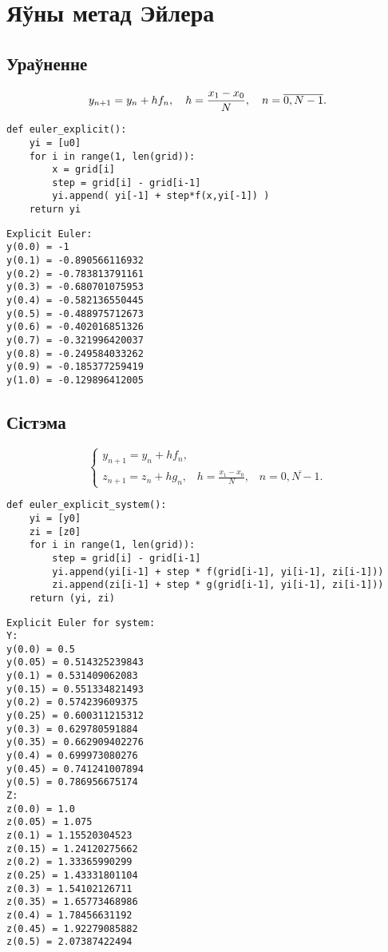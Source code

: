 \section{Яўны метад Эйлера}
\subsection*{Ураўненне}
\begin{equation}
    y_{n+1} = y_n + hf_n, \hspace{10pt} h = \frac{x_1-x_0}{N}, \hspace{10pt} n = \overline{0, N-1}. \\
\end{equation}

{\small
\begin{verbatim}
def euler_explicit():
    yi = [u0]
    for i in range(1, len(grid)):
        x = grid[i]
        step = grid[i] - grid[i-1]
        yi.append( yi[-1] + step*f(x,yi[-1]) )
    return yi
\end{verbatim}
}

{\small
\begin{verbatim}
Explicit Euler:
y(0.0) = -1
y(0.1) = -0.890566116932
y(0.2) = -0.783813791161
y(0.3) = -0.680701075953
y(0.4) = -0.582136550445
y(0.5) = -0.488975712673
y(0.6) = -0.402016851326
y(0.7) = -0.321996420037
y(0.8) = -0.249584033262
y(0.9) = -0.185377259419
y(1.0) = -0.129896412005
\end{verbatim}
}

\subsection*{Сістэма}
\begin{equation}
	\begin{cases}
y_{n+1} = y_n + hf_n, \\
z_{n+1} = z_n + hg_n, \hspace{10pt} h = \frac{x_1-x_0}{N}, \hspace{10pt} n = \overline{0, N-1}.
	\end{cases}
\end{equation}

{\small
\begin{verbatim}
def euler_explicit_system():
    yi = [y0]
    zi = [z0]
    for i in range(1, len(grid)):
        step = grid[i] - grid[i-1]
        yi.append(yi[i-1] + step * f(grid[i-1], yi[i-1], zi[i-1]))
        zi.append(zi[i-1] + step * g(grid[i-1], yi[i-1], zi[i-1]))
    return (yi, zi)
\end{verbatim}
}

{\small
\begin{verbatim}
Explicit Euler for system:
Y:
y(0.0) = 0.5
y(0.05) = 0.514325239843
y(0.1) = 0.531409062083
y(0.15) = 0.551334821493
y(0.2) = 0.574239609375
y(0.25) = 0.600311215312
y(0.3) = 0.629780591884
y(0.35) = 0.662909402276
y(0.4) = 0.699973080276
y(0.45) = 0.741241007894
y(0.5) = 0.786956675174
Z:
z(0.0) = 1.0
z(0.05) = 1.075
z(0.1) = 1.15520304523
z(0.15) = 1.24120275662
z(0.2) = 1.33365990299
z(0.25) = 1.43331801104
z(0.3) = 1.54102126711
z(0.35) = 1.65773468986
z(0.4) = 1.78456631192
z(0.45) = 1.92279085882
z(0.5) = 2.07387422494
\end{verbatim}
}
